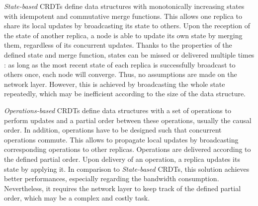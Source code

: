 \documentclass{article}
\begin{document}

\emph{State-based} \acp{CRDT} define data structures with monotonically increasing states with idempotent and commutative merge functions.
This allows one replica to share its local updates by broadcasting its state to others.
Upon the reception of the state of another replica, a node is able to update its own state by merging them,
regardless of its concurrent updates.
Thanks to the properties of the defined state and merge function, states can be missed or delivered multiple times :
as long as the most recent state of each replica is successfully broadcast to others once, each node will converge.
Thus, no assumptions are made on the network layer.
However, this is achieved by broadcasting the whole state repeatedly, which may be inefficient according to the size of the data structure.


\emph{Operations-based} \acp{CRDT} define data structures with a set of operations to perform updates
and a partial order between these operations, usually the causal order.
In addition, operations have to be designed such that concurrent operations commute.
This allows to propagate local updates by broadcasting corresponding operations to other replicas.
Operations are delivered according to the defined partial order.
Upon delivery of an operation, a replica updates its state by applying it.
In comparison to \emph{State-based} \acp{CRDT}, this solution achieves better performances, especially regarding the bandwidth consumption.
Nevertheless, it requires the network layer to keep track of the defined partial order, which may be a complex and costly task.

\end{document}
